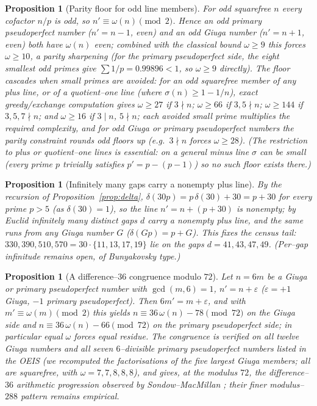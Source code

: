 \documentclass[11pt]{article}
\newtheorem{proposition}[theorem]{Proposition}
\theoremstyle{definition}
\begin{document}
\begin{proposition}[Parity floor for odd line members]\label{prop:parityfloor}
For odd squarefree $n$ every cofactor $n/p$ is odd, so $n'\equiv\omega(n)\pmod2$. Hence an odd primary
pseudoperfect number ($n'=n-1$, even) and an odd Giuga number ($n'=n+1$, even) both have $\omega(n)$ even;
combined with the classical bound $\omega\ge9$ \cite{BBBG1996,BorweinWong1997} this forces $\omega\ge10$, a
parity sharpening (for the primary pseudoperfect side, the eight smallest odd primes give $\sum1/p=0.99896<1$,
so $\omega\ge9$ directly). The floor cascades when small primes are avoided: for an odd squarefree member of
any plus line, or of a quotient--one line (where $\sigma(n)\ge1-1/n$), exact greedy/exchange computation
gives $\omega\ge27$ if $3\nmid n$; $\omega\ge66$ if $3,5\nmid n$; $\omega\ge144$ if $3,5,7\nmid n$; and
$\omega\ge16$ if $3\mid n$, $5\nmid n$; each avoided small prime multiplies the required complexity, and
for odd Giuga or primary pseudoperfect numbers the parity constraint rounds odd floors up (e.g.\ $3\nmid n$
forces $\omega\ge28$). (The restriction to plus or quotient--one lines is essential: on a general minus line
$\sigma$ can be small (every prime $p$ trivially satisfies $p'=p-(p-1)$) so no such floor exists
there.)
\end{proposition}

\begin{proposition}[Infinitely many gaps carry a nonempty plus line]\label{prop:plusinf}
By the recursion of Proposition~\ref{prop:delta}, $\delta(30p)=p\,\delta(30)+30=p+30$ for every prime $p>5$
(as $\delta(30)=1$), so the line $n'=n+(p+30)$ is nonempty; by Euclid infinitely many distinct gaps $d$ carry
a nonempty plus line, and the same runs from any Giuga number $G$ ($\delta(Gp)=p+G$). This fixes the census
tail: $330,390,510,570=30\cdot\{11,13,17,19\}$ lie on the gaps $d=41,43,47,49$. (Per--gap infinitude remains
open, of Bunyakovsky type.)
\end{proposition}

\begin{proposition}[A difference--$36$ congruence modulo $72$]\label{prop:mod72}
Let $n=6m$ be a Giuga or primary pseudoperfect number with $\gcd(m,6)=1$, $n'=n+\varepsilon$
($\varepsilon=+1$ Giuga, $-1$ primary pseudoperfect). Then $6m'=m+\varepsilon$, and with
$m'\equiv\omega(m)\pmod2$ this yields $n\equiv36\,\omega(n)-78\pmod{72}$ on the Giuga side and
$n\equiv36\,\omega(n)-66\pmod{72}$ on the primary pseudoperfect side; in particular equal $\omega$ forces
equal residue. The congruence is verified on all twelve Giuga numbers and all seven $6$--divisible primary
pseudoperfect numbers listed in the OEIS (we recomputed the factorisations of the five largest Giuga
members; all are squarefree, with $\omega=7,7,8,8,8$), and gives, at the modulus $72$, the
difference--$36$ arithmetic progression observed by Sondow--MacMillan \cite{SondowMacMillan2017}; their
finer modulus--$288$ pattern remains empirical.
\end{proposition}
\end{document}
